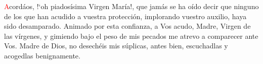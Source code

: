 \textcolor{red}{A}cordáos, {!`}oh piadosísima Virgen María!, que jamás se ha oído decir que ninguno de los que han acudido a vuestra protección, 
implorando vuestro auxilio, haya sido desamparado. Animado por esta confianza, a Vos acudo, Madre, Virgen de las vírgenes, y gimiendo 
bajo el peso de mis pecados me atrevo a comparecer ante Vos. Madre de Dios, no desechéis mis súplicas, antes bien, escuchadlas y 
acogedlas benignamente.